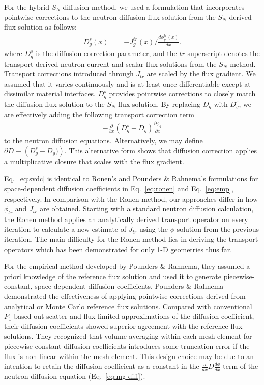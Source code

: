 For the hybrid $S_N$-diffusion method, we used a formulation that incorporates pointwise
corrections to the neutron diffusion flux solution from the $S_N$-derived flux solution as follows:
%
\begin{align}
  D^s_g(x) &= -J^{tr}_g(x)\bigg/\frac{d\phi^{tr}_g(x)}{dx}. \label{eq:svdc}
\end{align}
%
where $D^s_g$ is the diffusion correction parameter, and the $tr$ superscript denotes the
transport-derived neutron
current and scalar flux solutions from the $S_N$ method. Transport corrections introduced through
$J_{tr}$ are scaled by the flux gradient. We assumed that it varies continuously and is
at least once differentiable except at dissimilar material interfaces. $D^s_g$ provides
pointwise corrections to closely match the diffusion flux solution to the $S_N$ flux solution.
By replacing $D_g$ with $D^s_g$, we are effectively adding the following transport correction term
%
\begin{gather}
  -\frac{\partial}{\partial x}(D^s_g-D_g)\frac{\partial\phi_g}{\partial x}
\end{gather}
to the neutron diffusion equations. Alternatively, we may define
$\partial D\equiv\left(D^s_g-D_g)\right)$. This alternative form shows that diffusion
correction applies a multiplicative closure that scales with the flux gradient.

Eq.\ \ref{eq:svdc} is identical to Ronen's \cite{ronen_accurate_2004} and Pounders \& Rahnema's
\cite{pounders_diffusion_2009} formulations for space-dependent diffusion coefficients in Eq.\
\ref{eq:ronen} and Eq.\ \ref{eq:emp}, respectively. In comparison with
the Ronen method, our approaches differ in how $\phi_{tr}$ and $J_{tr}$ are obtained. Starting with
a standard neutron diffusion calculation, the Ronen method applies an analytically derived
transport operator on every iteration to calculate a new estimate of $J_{tr}$ using the $\phi$
solution from the previous iteration. The main difficulty for the Ronen method lies in deriving the
transport operators which has been demonstrated for only 1-D geometries thus far.

For the empirical method developed by Pounders \& Rahnema, they assumed a priori knowledge of the
reference flux solution and used it to generate piecewise-constant, space-dependent diffusion
coefficients.
Pounders \& Rahnema \cite{pounders_diffusion_2009} demonstrated the effectiveness of applying
pointwise corrections derived from analytical or Monte Carlo reference flux solutions. Compared
with conventional $P_1$-based out-scatter and flux-limited approximations of the diffusion
coefficient, their diffusion coefficients showed superior agreement
with the reference flux solutions. They recognized that volume averaging within each mesh element
for piecewise-constant diffusion coefficients introduces some truncation error if the flux is
non-linear within the mesh element. This design choice may be due to an intention to retain the
diffusion coefficient as a constant in the $\frac{d}{dx}D\frac{d\phi}{dx}$ term of the neutron
diffusion equation (Eq.\ \ref{eq:mg-diff}).

